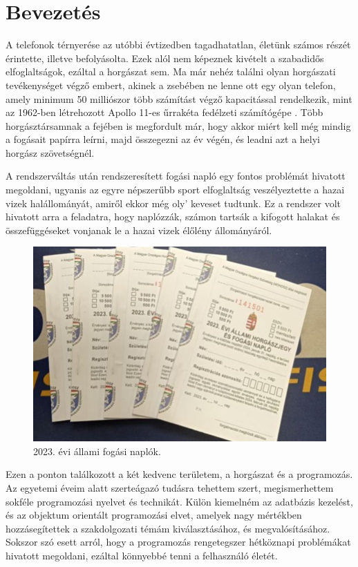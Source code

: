 \chapter{Bevezetés}

A telefonok térnyerése az utóbbi évtizedben tagadhatatlan, életünk számos részét érintette,
illetve befolyásolta. Ezek alól nem képeznek kivételt a szabadidős elfoglaltságok, ezáltal
a horgászat sem. Ma már nehéz találni olyan horgászati tevékenységet végző embert, akinek a zsebében
ne lenne ott egy olyan telefon, amely minimum 50 milliószor több számítást végző kapacitással rendelkezik,
mint az 1962-ben létrehozott Apollo 11-es űrrakéta fedélzeti számítógépe \cite{realclearscience}. Több horgásztársamnak a fejében
is megfordult már, hogy akkor miért kell még mindig a fogásait papírra leírni, majd összegezni az év végén, 
és leadni azt a helyi horgász szövetségnél.

A rendszerváltás után rendszeresített fogási napló egy fontos problémát hivatott megoldani, ugyanis az 
egyre népszerűbb sport elfoglaltság veszélyeztette a hazai vizek halállományát, amiről ekkor még oly' keveset tudtunk.
Ez a rendszer volt hivatott arra a feladatra, hogy naplózzák, számon tartsák a kifogott halakat és összefüggéseket vonjanak le a hazai vizek élőlény állományáról.

\begin{figure}[h]
\centering
\includegraphics[scale=0.3]{images/fogasi_naplo.jpg}
\caption{2023. évi állami fogási naplók.}
\label{fig:fogasinaplok}
\end{figure}

Ezen a ponton találkozott a két kedvenc területem, a horgászat és a programozás. 
Az egyetemi éveim alatt szerteágazó tudásra tehettem szert, megismerhettem sokféle programozási nyelvet és
technikát. Külön kiemelném az adatbázis kezelést, és az objektum orientált programozási elvet, amelyek
nagy mértékben hozzásegítettek a szakdolgozati témám kiválasztásához, és megvalósításához.
Sokszor szó esett arról, hogy a programozás rengetegszer hétköznapi problémákat hivatott megoldani, ezáltal
könnyebbé tenni a felhasználó életét. 

